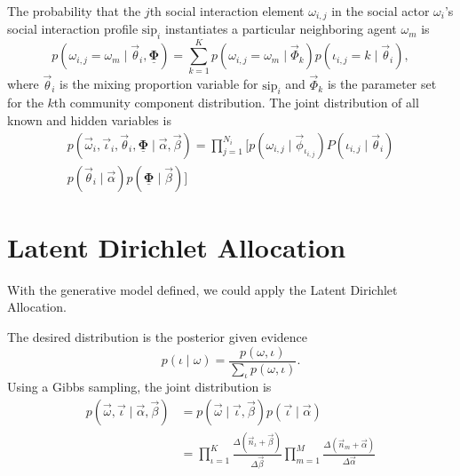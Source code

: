 \documentclass[letterpaper]{article}
\begin{document}
The probability that the $ j $th social interaction element $ \omega_{i,j} $ in the social actor $ \omega_{i} $'s social interaction profile $ \mbox{sip}_{i} $ instantiates a particular neighboring agent $ \omega_{m} $ is
\begin{equation}
p( \omega_{i,j} = \omega_{m} \mid \vec{\theta}_{i} , \underline{\mathbf{\Phi}} ) = \sum_{k=1}^{K} p( \omega_{i,j} = \omega_{m} \mid \vec{\Phi}_{k} ) p( \iota_{i,j} = k \mid \vec{\theta}_{i} ),
\end{equation}
where $ \vec{\theta}_{i} $ is the mixing proportion variable for $ \mbox{sip}_{i} $ and $ \vec{\Phi}_{k} $ is the parameter set for the $ k $th community component distribution.
The joint distribution of all known and hidden variables is
\begin{equation}
\begin{aligned}
p( \vec{\omega}_{i} , \vec{\iota}_{i}, \vec{\theta}_{i} , \underline{\mathbf{\Phi}}  \mid \vec{\alpha} , \vec{\beta} ) = \prod_{j=1}^{N_{i}} 
[ 
p( \omega_{i,j} \mid \vec{\phi}_{\iota_{i,j}} ) P( \iota_{i,j} \mid \vec{\theta}_{i} ) \\
p( \vec{\theta}_{i} \mid \vec{\alpha} ) p( \underline{\mathbf{\Phi}} \mid \vec{\beta} )
]
\end{aligned}
\end{equation}

\section{Latent Dirichlet Allocation}

With the generative model defined, we could apply the Latent Dirichlet Allocation.

The desired distribution is the posterior given evidence
\begin{equation}
p( \iota \mid \omega ) = \frac{ p( \omega , \iota ) }{ \sum_{ \iota } p( \omega , \iota ) }.
\end{equation}
Using a Gibbs sampling, the joint distribution is
\begin{equation}
\begin{aligned}
p( \vec{\omega}, \vec{\iota} \mid \vec{\alpha}, \vec{\beta} )  & = p( \vec{\omega} \mid \vec{\iota}, \vec{\beta} ) p( \vec{\iota} \mid \vec{\alpha} ) \\
& = \prod_{\iota = 1}^{K} \frac{\Delta(\vec{n}_{\iota}+\vec{\beta})}{\Delta{\vec{\beta}}}
\prod_{m=1}^{M} \frac{\Delta(\vec{n}_{m}+\vec{\alpha})}{\Delta{\vec{\alpha}}}
\end{aligned}
\end{equation}
\end{document}
